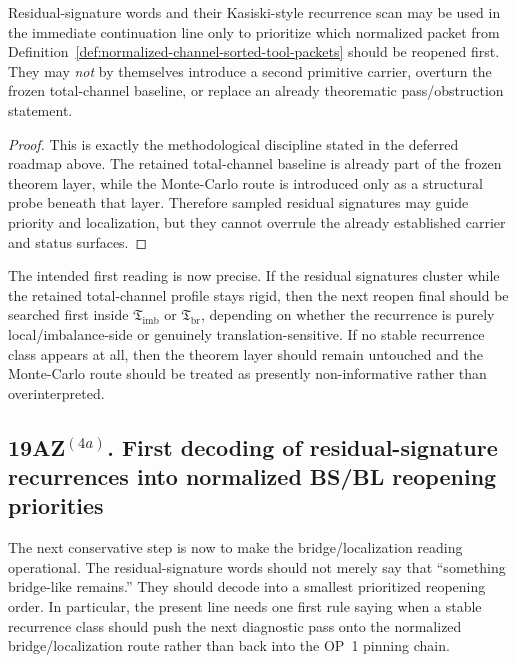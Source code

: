 \begin{proposition}
\label{prop:conservative-monte-carlo-qam-probe-rule}
Residual-signature words and their Kasiski-style recurrence scan may be used in the immediate continuation line only to prioritize which normalized packet from Definition~\ref{def:normalized-channel-sorted-tool-packets} should be reopened first. They may \emph{not} by themselves introduce a second primitive carrier, overturn the frozen total-channel baseline, or replace an already theorematic pass/obstruction statement.
\end{proposition}

\begin{proof}
This is exactly the methodological discipline stated in the deferred roadmap above. The retained total-channel baseline is already part of the frozen theorem layer, while the Monte-Carlo route is introduced only as a structural probe beneath that layer. Therefore sampled residual signatures may guide priority and localization, but they cannot overrule the already established carrier and status surfaces.
\end{proof}

\begin{remark}
\label{rem:immediate-diagnostic-reading-signatures}
The intended first reading is now precise. If the residual signatures cluster while the retained total-channel profile stays rigid, then the next reopen final should be searched first inside \(\mathfrak T_{\mathrm{imb}}\) or \(\mathfrak T_{\mathrm{br}}\), depending on whether the recurrence is purely local/imbalance-side or genuinely translation-sensitive. If no stable recurrence class appears at all, then the theorem layer should remain untouched and the Monte-Carlo route should be treated as presently non-informative rather than overinterpreted.
\end{remark}


\subsection*{19AZ$^{(4a)}$. First decoding of residual-signature recurrences into normalized BS/BL reopening priorities}
\label{sec:first-decoding-of-signature-recurrences-into-bs-bl-priorities}
The next conservative step is now to make the bridge/localization reading operational. The residual-signature words should not merely say that ``something bridge-like remains.'' They should decode into a smallest prioritized reopening order. In particular, the present line needs one first rule saying when a stable recurrence class should push the next diagnostic pass onto the normalized bridge/localization route rather than back into the OP~1 pinning chain.

